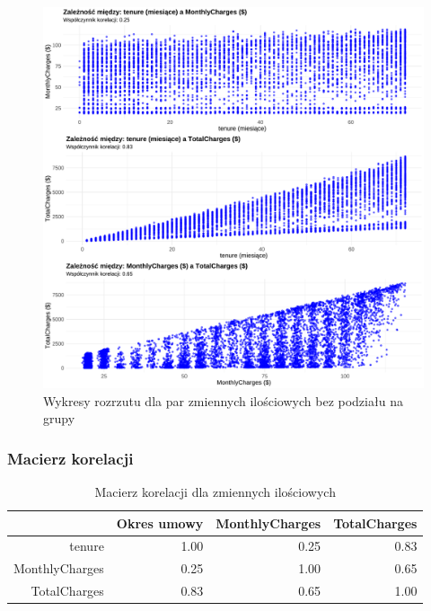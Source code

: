 \documentclass[12pt, a4paper]{article}\usepackage[]{graphicx}\usepackage[]{xcolor}
\makeatletter
\def\maxwidth{ %
  \ifdim\Gin@nat@width>\linewidth
    \linewidth
  \else
    \Gin@nat@width
  \fi
}
\newenvironment{knitrout}{}{} %
\makeatother
\begin{document}
\begin{knitrout}
\color{fgcolor}\begin{figure}[H]

{\centering \includegraphics[width=\maxwidth]{figure/scatterploty-wszystkie-dane-1} 

}

\caption[Wykresy rozrzutu dla par zmiennych ilościowych bez podziału na grupy]{Wykresy rozrzutu dla par zmiennych ilościowych bez podziału na grupy}\label{fig:scatterploty-wszystkie-dane}
\end{figure}

\end{knitrout}

\subsubsection{Macierz korelacji}
\begin{table}[ht]
\centering
\caption{Macierz korelacji dla zmiennych ilościowych} 
\label{tab:korelacja}
\begin{tabular}{rrrr}
  \hline
 & Okres umowy & MonthlyCharges & TotalCharges \\ 
  \hline
tenure & 1.00 & 0.25 & 0.83 \\ 
  MonthlyCharges & 0.25 & 1.00 & 0.65 \\ 
  TotalCharges & 0.83 & 0.65 & 1.00 \\ 
   \hline
\end{tabular}
\end{table}
\end{document}
